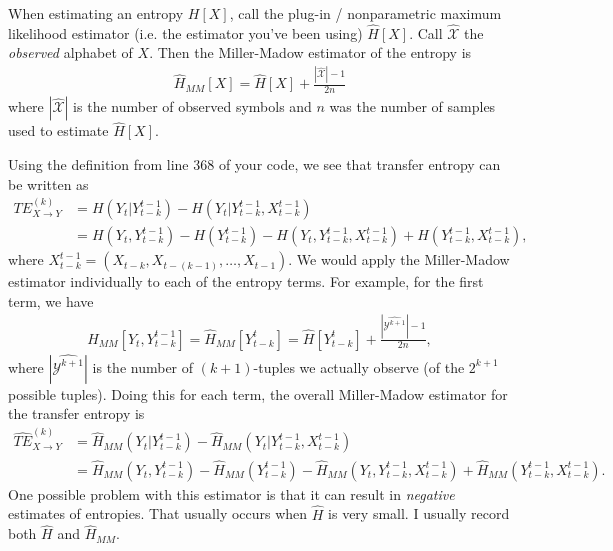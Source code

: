 \documentclass{article}
\begin{document}
	
	When estimating an entropy $H[X]$, call the plug-in / nonparametric maximum likelihood estimator (i.e. the estimator you've been using) $\hat{H}[X]$. Call $\hat{\mathcal{X}}$ the \emph{observed} alphabet of $X$. Then the Miller-Madow estimator of the entropy is
	\begin{align}
		\hat{H}_{MM}[X] = \hat{H}[X] + \frac{|\hat{\mathcal{X}}| - 1}{2 n}
	\end{align}
	where $|\mathcal{\hat{X}}|$ is the number of observed symbols and $n$ was the number of samples used to estimate $\hat{H}[X].$

	Using the definition from line 368 of your code, we see that transfer entropy can be written as
	\begin{align}
		TE_{X \to Y}^{(k)} &= H(Y_t | Y_{t-k}^{t-1}) - H(Y_t | Y_{t-k}^{t-1},X_{t-k}^{t-1}) \\ 
		&= H(Y_t,Y_{t-k}^{t-1})-H(Y_{t-k}^{t-1})-H(Y_t,Y_{t-k}^{t-1},X_{t-k}^{t-1})+H(Y_{t-k}^{t-1},X_{t-k}^{t-1}),
	\end{align}
	where $X_{t-k}^{t-1} = (X_{t - k}, X_{t - (k - 1)}, \ldots, X_{t - 1})$. We would apply the Miller-Madow estimator individually to each of the entropy terms. For example, for the first term, we have
	\begin{align}
		\hat{H}_{MM}[Y_{t}, Y_{t - k}^{t-1}] = \hat{H}_{MM}[Y_{t - k}^{t}] = \hat{H}[Y_{t-k}^{t}] + \frac{|\widehat{\mathcal{Y}^{k+1}}| - 1}{2n},
	\end{align}
	where $|\widehat{\mathcal{Y}^{k+1}}|$ is the number of $(k + 1)$-tuples we actually observe (of the $2^{k + 1}$ possible tuples). Doing this for each term, the overall Miller-Madow estimator for the transfer entropy is
	\begin{align}
		\widehat{TE}_{X \to Y}^{(k)} &= \hat{H}_{MM}(Y_t | Y_{t-k}^{t-1}) - \hat{H}_{MM}(Y_t | Y_{t-k}^{t-1},X_{t-k}^{t-1}) \\ 
		&= \hat{H}_{MM}(Y_t,Y_{t-k}^{t-1})-\hat{H}_{MM}(Y_{t-k}^{t-1})-\hat{H}_{MM}(Y_t,Y_{t-k}^{t-1},X_{t-k}^{t-1})+\hat{H}_{MM}(Y_{t-k}^{t-1},X_{t-k}^{t-1}).
	\end{align}
	One possible problem with this estimator is that it can result in \emph{negative} estimates of entropies. That usually occurs when $\hat{H}$ is very small. I usually record both $\hat{H}$ and $\hat{H}_{MM}$.
\end{document}
